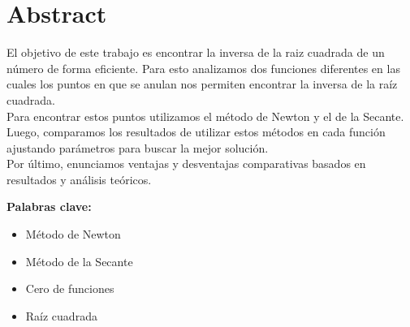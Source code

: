 \section{Abstract}

El objetivo de este trabajo es encontrar la inversa de la raiz cuadrada de un
número de forma eficiente. Para esto analizamos dos funciones diferentes en las
cuales los puntos en que se anulan nos permiten encontrar la inversa de la raíz
cuadrada.\\

Para encontrar estos puntos utilizamos el método de Newton y el de la Secante.
Luego, comparamos los resultados de utilizar estos métodos en cada función
ajustando parámetros para buscar la mejor solución.\\

Por último, enunciamos ventajas y desventajas comparativas basados en
resultados y análisis teóricos.




{\bf Palabras clave:}
\begin{itemize} 
    \item Método de Newton 
    \item Método de la Secante 
    \item Cero de funciones
    \item Raíz cuadrada
\end{itemize}
